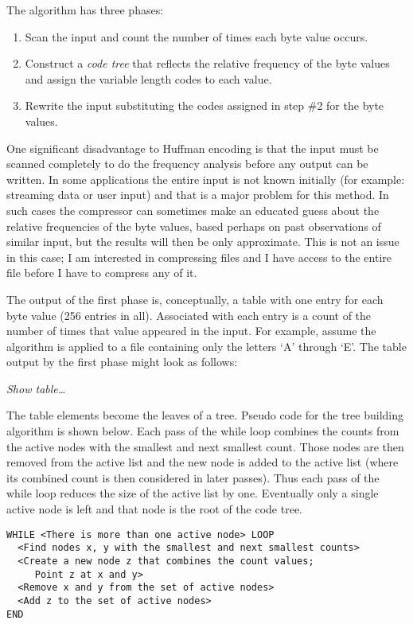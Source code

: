 \documentclass{scrreprt}
\newcommand{\newterm}[1]{\textit{#1}}  %
\begin{document}
The algorithm has three phases:

\begin{enumerate}

\item Scan the input and count the number of times each byte value occurs.

\item Construct a \newterm{code tree} that reflects the relative frequency of the byte values
  and assign the variable length codes to each value.

\item Rewrite the input substituting the codes assigned in step \#2 for the byte values.

\end{enumerate}

One significant disadvantage to Huffman encoding is that the input must be scanned completely to
do the frequency analysis before any output can be written. In some applications the entire
input is not known initially (for example: streaming data or user input) and that is a major
problem for this method. In such cases the compressor can sometimes make an educated guess about
the relative frequencies of the byte values, based perhaps on past observations of similar
input, but the results will then be only approximate. This is not an issue in this case; I am
interested in compressing files and I have access to the entire file before I have to compress
any of it.

The output of the first phase is, conceptually, a table with one entry for each byte value (256
entries in all). Associated with each entry is a count of the number of times that value
appeared in the input. For example, assume the algorithm is applied to a file containing only
the letters `A' through `E'. The table output by the first phase might look as follows:

\textit{Show table\ldots}

The table elements become the leaves of a tree. Pseudo code for the tree building algorithm is
shown below. Each pass of the while loop combines the counts from the active nodes with the
smallest and next smallest count. Those nodes are then removed from the active list and the new
node is added to the active list (where its combined count is then considered in later passes).
Thus each pass of the while loop reduces the size of the active list by one. Eventually only a
single active node is left and that node is the root of the code tree.

\begin{Verbatim}
WHILE <There is more than one active node> LOOP
  <Find nodes x, y with the smallest and next smallest counts>
  <Create a new node z that combines the count values;
     Point z at x and y>
  <Remove x and y from the set of active nodes>
  <Add z to the set of active nodes>
END
\end{Verbatim}
\end{document}
